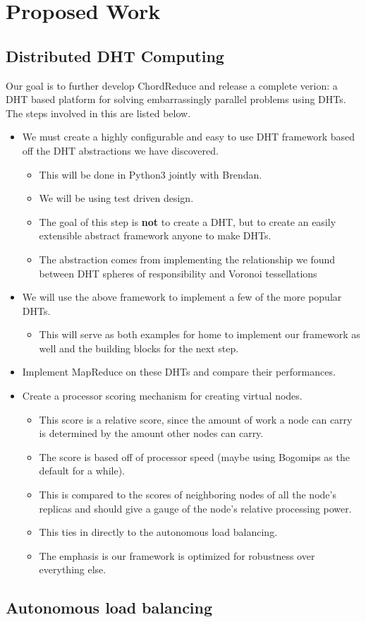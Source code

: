 \chapter{Proposed Work}

\section{Distributed DHT Computing}




Our goal is to further develop ChordReduce and release a complete verion: a DHT based platform for solving embarrassingly parallel problems using DHTs.
The steps involved in this are listed below.

\begin{itemize}
	\item We must create a highly configurable and easy to use DHT framework based off the DHT abstractions we have discovered.
	\begin{itemize}
		\item This will be done in Python3 jointly with Brendan.
		\item We will be using test driven design.
		\item The goal of this step is \textbf{not} to create a DHT, but to create an easily extensible abstract framework anyone to make DHTs.
		\item The abstraction comes from implementing the relationship we found between DHT spheres of responsibility and Voronoi tessellations
	\end{itemize}
	\item We will use the above framework to implement a few of the more popular DHTs.
	\begin{itemize}
		\item This will serve as both examples for home to implement our framework as well and the building blocks for the next step.
	\end{itemize}
	\item Implement MapReduce on these DHTs and compare their performances.
	\item Create a  processor scoring mechanism for creating virtual nodes.
	\begin{itemize}
		\item This score is a relative score, since the amount of work a node can carry is determined by the amount other nodes can carry.
		\item The score is based off of processor speed (maybe using Bogomips as the default for a while).
		\item This is compared to the scores of neighboring nodes  of all the node's replicas and should give a gauge of the node's relative processing power.
		\item This ties in directly to the autonomous load balancing.
	\end{itemize}
	\begin{itemize}
		\item The emphasis is our framework is optimized for robustness over everything else.
	\end{itemize}
	
\end{itemize}



\section{Autonomous load balancing}



